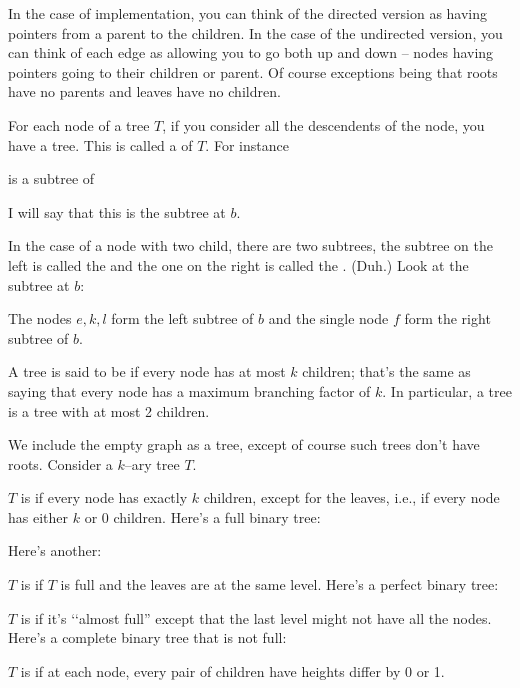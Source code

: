 

In the case of implementation, you can think of the directed version
as having pointers from a parent to the children.
In the case of the undirected version, you can think of
each edge as allowing you to go both up and down -- 
nodes having pointers going to their children or parent.
Of course exceptions being that roots have no parents and leaves have no
children.

For each node of a tree $T$, if you consider all the descendents of the node, 
you have a tree. This is called a  of $T$.
For instance



is a subtree of 



I will say that this is the subtree at $b$.

In the case of a node with two child, 
there are two subtrees, the subtree on the left is called the 
 and the one on the right is called the 
.
(Duh.)
Look at the subtree at $b$:



The nodes $e,k,l$ form the left subtree of $b$
and the single node $f$ form the right subtree of $b$.


A tree is said to be  if every node has at most $k$ children;
that's the same as saying that every node has a maximum branching factor of
$k$.
In particular, a  tree is a tree with at most 2 children.



We include the empty graph as a tree, except of course such trees
don't have roots.
Consider a $k$--ary tree $T$.
\begin{myenum}

\li $T$ is  if every node has exactly $k$ children, except for 
the leaves, i.e., if every node has
either $k$ or $0$ children.
Here's a full binary tree:



Here's another:



\li $T$ is  if $T$ is full and the leaves are 
at the same level.
Here's a perfect binary tree:


 
\li $T$ is  if it's \lq\lq almost full'' 
except that the last level 
might not have all the nodes. 
Here's a complete binary tree that is not full:


      
\li $T$ is  if at each node,
every pair of children have heights differ by 0 or 1.
\end{myenum}

